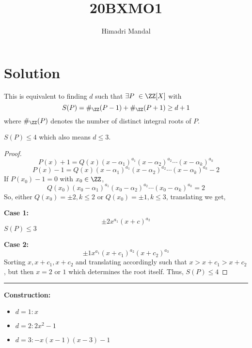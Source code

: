 \documentclass[11pt]{scrartcl}
\title{20BXMO1}
\author{Himadri Mandal}
\begin{document}
\maketitle

\section{Solution}
\begin{soln}
  \raggedright
  This is equivalent to finding $d$ such that $\exists P \ \in \ZZ[X]$ with 
  \[S(P) = \#_{\ZZ}(P-1) + \#_{\ZZ}(P+1) \geq  d+1 \]
  where $\#_{\ZZ}(P)$ denotes the number of distinct integral roots of $P$. 
  \begin{claim*}
    $S(P) \leq 4$ which also means $d \leq 3$.   
  \end{claim*}
  \begin{proof}
    \[ P(x) + 1 =  Q(x) (x-\alpha_1)^{a_1}(x-\alpha_2)^{a_2}\cdots (x-\alpha_k)^{a_k} \]
    \[ P(x) - 1 =  Q(x) (x-\alpha_1)^{a_1}(x-\alpha_2)^{a_2}\cdots (x-\alpha_k)^{a_k} - 2\]
    If $P(x_0)-1 = 0$ with $x_0 \in \ZZ$, 
    \[ Q(x_0)(x_0 - \alpha_1)^{a_1}(x_0 - \alpha_2)^{a_2} \cdots (x_0 - \alpha_k)^{a_k} = 2 \]
    So, either $Q(x_0) = \pm 2, k \leq 2$ or $Q(x_0) = \pm 1, k \leq 3$, translating we get,

    \textbf{Case 1:}
    \[ \pm2 x^{a_1}(x+c)^{a_2} \]
    $S(P) \leq 3$   

    \textbf{Case 2:}
    \[ \pm 1 x^{a_1}(x+c_1)^{a_2}(x+c_2)^{a_3}\]
    Sorting $x,x+c_1,x+c_2$ and translating accordingly such that $x > x+c_1 > x+c_2$, but then $x = 2 \text{ or } 1$ which 
    determines the root itself. Thus, $S(P) \leq 4$ 
  \end{proof}  \hrule

  \bigskip

  \textbf{Construction:} 
  \begin{itemize}
    \item $d = 1: x$
    \item $d = 2: 2x^2 -1$
    \item $d = 3: -x(x-1)(x-3)-1$
  \end{itemize} 

\end{soln}
\end{document}
